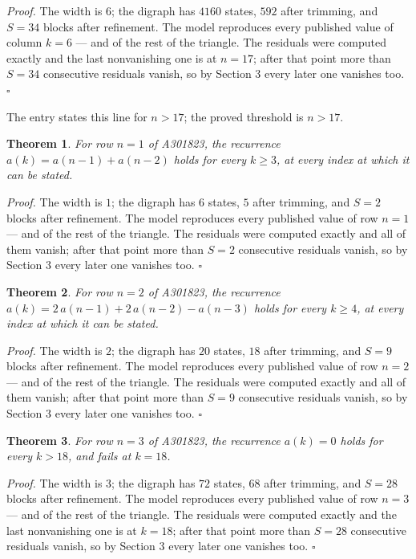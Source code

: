\documentclass[11pt]{article}
\newtheorem{theorem}{Theorem}
\theoremstyle{definition}
\begin{document}
{\itshape Proof.} The width is $6$; the digraph has $4160$ states, $592$ after trimming, and $S = 34$ blocks after refinement. The model reproduces every published value of column $k = 6$ --- and of the rest of the triangle. The residuals were computed exactly and the last nonvanishing one is at $n = 17$; after that point more than $S = 34$ consecutive residuals vanish, so by Section 3 every later one vanishes too. $\square$

The entry states this line for $n > 17$; the proved threshold is $n > 17$.

\begin{theorem} For row $n = 1$ of A301823, the recurrence $a(k) = a(n-1) + a(n-2)$ holds for every $k \ge 3$, at every index at which it can be stated.\end{theorem}

{\itshape Proof.} The width is $1$; the digraph has $6$ states, $5$ after trimming, and $S = 2$ blocks after refinement. The model reproduces every published value of row $n = 1$ --- and of the rest of the triangle. The residuals were computed exactly and all of them vanish; after that point more than $S = 2$ consecutive residuals vanish, so by Section 3 every later one vanishes too. $\square$

\begin{theorem} For row $n = 2$ of A301823, the recurrence $a(k) = 2\,a(n-1) + 2\,a(n-2) - a(n-3)$ holds for every $k \ge 4$, at every index at which it can be stated.\end{theorem}

{\itshape Proof.} The width is $2$; the digraph has $20$ states, $18$ after trimming, and $S = 9$ blocks after refinement. The model reproduces every published value of row $n = 2$ --- and of the rest of the triangle. The residuals were computed exactly and all of them vanish; after that point more than $S = 9$ consecutive residuals vanish, so by Section 3 every later one vanishes too. $\square$

\begin{theorem} For row $n = 3$ of A301823, the recurrence $a(k) = 0$ holds for every $k > 18$, and fails at $k = 18$.\end{theorem}

{\itshape Proof.} The width is $3$; the digraph has $72$ states, $68$ after trimming, and $S = 28$ blocks after refinement. The model reproduces every published value of row $n = 3$ --- and of the rest of the triangle. The residuals were computed exactly and the last nonvanishing one is at $k = 18$; after that point more than $S = 28$ consecutive residuals vanish, so by Section 3 every later one vanishes too. $\square$
\end{document}
